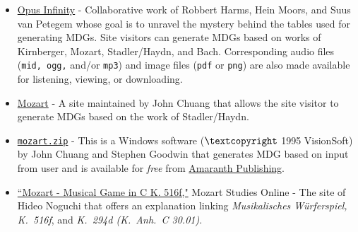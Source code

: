 \documentclass[letterpaper,x11names,svgnames,10pt]{article}
\begin{document}
{\begin{itemize}
	\item \hyperref{https://opus-infinity.org}{}{}{Opus Infinity} - Collaborative work of Robbert Harms, Hein Moors, and Suus van Petegem whose goal is to unravel the mystery behind the tables used for generating MDGs.  Site visitors can generate MDGs based on works of Kirnberger, Mozart, Stadler/Haydn, and Bach.  Corresponding audio files ({\tt mid, ogg,} and/or {\tt mp3}) and image files ({\tt pdf} or {\tt png}) are also made available for listening, viewing, or downloading.
	
	\item  \hyperref{http://sunsite.univie.ac.at/Mozart/dice/}{}{}{Mozart} - A site maintained by John Chuang that allows the site visitor to generate MDGs based on the work of Stadler/Haydn.
 	
 	\item \hyperref{http://www.amaranthpublishing.com/MozartDiceGame.htm}{}{}{\tt mozart.zip} -  This is a Windows software ($\textcopyright$ 1995 VisionSoft) by John Chuang and Stephen Goodwin that generates MDG based on input from user and is available for {\it free} from  \hyperref{http://www.amaranthpublishing.com/MozartDiceGame.htm}{}{}{Amaranth Publishing}.  
 	
 	\item \hyperref{(http://www.asahi-net.or.jp/\~rb5h-ngc/e/k516f.htm}{}{}{``Mozart - Musical Game in C K. 516f,"}	Mozart Studies Online - The site of Hideo Noguchi that offers an explanation linking {\em Musikalisches W\"{u}rferspiel, K.\ 516f}, and  {\em K.\ 294d (K.\ Anh.\ C 30.01)}. 
\end{itemize}

}
\end{document}
